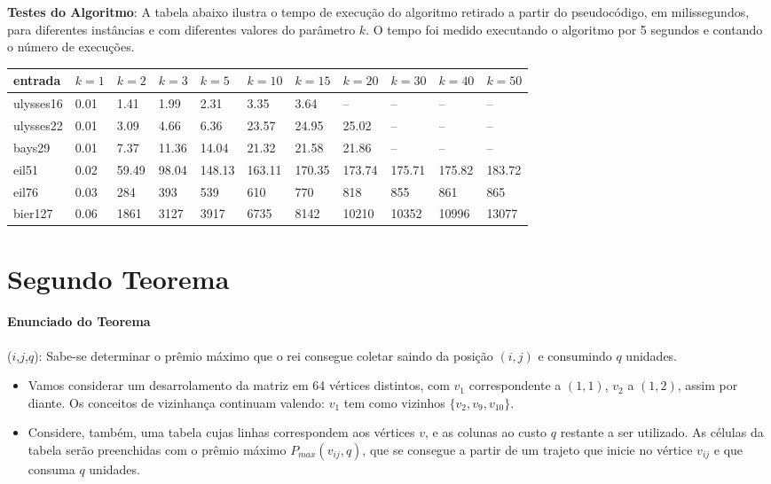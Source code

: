 \documentclass[paper=a4, fontsize=11pt]{scrartcl} %
\numberwithin{equation}{section} %
\numberwithin{figure}{section} %
\numberwithin{table}{section} %
\begin{document}
\textbf{Testes do Algoritmo}: A tabela abaixo ilustra o tempo de execução do algoritmo retirado a partir do pseudocódigo, em milissegundos, para diferentes instâncias e com diferentes valores do parâmetro $k$. O tempo foi medido executando o algoritmo por 5 segundos e contando o número de execuções.

\begin{table}[H]
\centering
\begin{tabular}{l|l|l|l|l|l|l|l|l|l|l}
entrada & $k=1$ & $k=2$ & $k=3$ & $k=5$ & $k=10$ & $k=15$ & $k=20$ & $k=30$ & $k=40$ & $k=50$\\\hline
ulysses16 & 0.01 & 1.41 & 1.99 & 2.31 & 3.35 & 3.64 & -- & -- & -- & --\\
ulysses22 & 0.01 & 3.09 & 4.66 & 6.36 & 23.57 & 24.95 & 25.02 & -- & -- & --\\
bays29 & 0.01 & 7.37 & 11.36 & 14.04 & 21.32 & 21.58 & 21.86 & -- & -- & --\\
eil51 & 0.02 & 59.49 & 98.04 & 148.13 & 163.11 & 170.35 & 173.74 & 175.71 & 175.82 & 183.72\\
eil76 & 0.03 & 284 & 393 & 539 & 610 & 770 & 818 & 855 & 861 & 865\\
bier127 & 0.06 & 1861 & 3127 & 3917 & 6735 & 8142 & 10210 & 10352 & 10996 & 13077
\end{tabular}
\end{table}


\section{Segundo Teorema}

\paragraph{Enunciado do Teorema}($i$,$j$,$q$): Sabe-se determinar o prêmio máximo que o rei consegue coletar saindo da posição $(i,j)$ e consumindo $q$ unidades.

\begin{itemize}
   \item Vamos considerar um desarrolamento da matriz em 64 vértices distintos, com $v_1$ correspondente a $(1,1)$, $v_2$ a $(1,2)$, assim por diante. Os conceitos de vizinhança continuam valendo: $v_1$ tem como vizinhos $\{v_2, v_9, v_10\}$.
   \item Considere, também, uma tabela cujas linhas correspondem aos vértices $v$, e as colunas ao custo $q$ restante a ser utilizado. As células da tabela serão preenchidas com o prêmio máximo $P_{max}(v_{ij},q)$, que se consegue a partir de um trajeto que inicie no vértice $v_{ij}$ e que consuma $q$ unidades.
\end{itemize}
\end{document}
